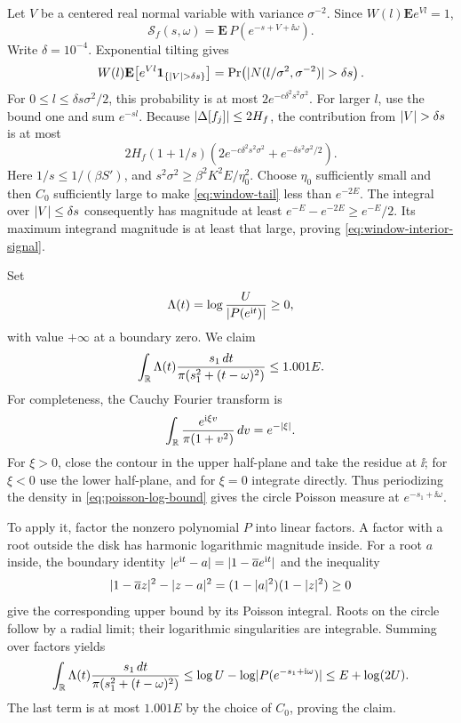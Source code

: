 Let $V$ be a centered real normal variable with variance $\sigma^{-2}$.
Since $W(l)\mathbf E e^{Vl}=1$,
\[
 \mathcal S_f(s,\omega)=\mathbf E\,P(e^{-s+V+\ii\omega}).
\]
Write $\delta=10^{-4}$.  Exponential tilting gives
\[
 W(l)\mathbf E\big[e^{Vl}\mathbf1_{\{\lvert V\rvert>\delta s\}}\big]
 =\Pr\!\left(\lvert N(l/\sigma^2,\sigma^{-2})\rvert>\delta s\right).
\]
For $0\le l\le\delta s\sigma^2/2$, this probability is at most
$2e^{-c\delta^2s^2\sigma^2}$.  For larger $l$, use the bound one and sum
$e^{-sl}$.  Because $\lvert \Delta[f_j]\rvert\le2H_f$, the contribution from
$\lvert V\rvert>\delta s$ is at most
\begin{equation}\label{eq:window-tail}
 2H_f(1+1/s)\left(2e^{-c\delta^2s^2\sigma^2}
                      +e^{-\delta s^2\sigma^2/2}\right).
\end{equation}
Here $1/s\le1/(\beta S')$, and
$s^2\sigma^2\ge\beta^2K^2E/\eta_0^2$.  Choose $\eta_0$ sufficiently small
and then $C_0$ sufficiently large to make \eqref{eq:window-tail} less than
$e^{-2E}$.  The integral over $\lvert V\rvert\le\delta s$ consequently has magnitude
at least $e^{-E}-e^{-2E}\ge e^{-E}/2$.  Its maximum integrand magnitude is
at least that large, proving \eqref{eq:window-interior-signal}.

Set
\[
 \Lambda(t)=\log\frac{U}{\lvert P(e^{\mathrm i t})\rvert}\ge0,
\]
with value $+\infty$ at a boundary zero.  We claim
\begin{equation}\label{eq:poisson-log-bound}
 \int_{\mathbb R}\Lambda(t)\frac{s_1\,dt}
 {\pi(s_1^2+(t-\omega)^2)}\le1.001E.
\end{equation}
For completeness, the Cauchy Fourier transform is
\begin{equation}\label{eq:cauchy-transform}
 \int_{\mathbb R}\frac{e^{\mathrm i\xi v}}{\pi(1+v^2)}\,dv=e^{-\lvert \xi\rvert}.
\end{equation}
For $\xi>0$, close the contour in the upper half-plane and take the residue
at $\ii$; for $\xi<0$ use the lower half-plane, and for $\xi=0$ integrate
directly.  Thus periodizing the density in
\eqref{eq:poisson-log-bound} gives the circle Poisson measure at
$e^{-s_1+\ii\omega}$.

To apply it, factor the nonzero polynomial $P$ into linear factors.  A factor
with a root outside the disk has harmonic logarithmic magnitude inside.  For
a root $a$ inside, the boundary identity
$\lvert e^{\mathrm i t}-a\rvert=\lvert 1-\overline a e^{\mathrm i t}\rvert$ and the inequality
\[
 \lvert 1-\overline a z\rvert^2-\lvert z-a\rvert^2
 =(1-\lvert a\rvert^2)(1-\lvert z\rvert^2)\ge0
\]
give the corresponding upper bound by its Poisson integral.  Roots on the
circle follow by a radial limit; their logarithmic singularities are
integrable.  Summing over factors yields
\[
 \int_{\mathbb R}\Lambda(t)\frac{s_1\,dt}{\pi(s_1^2+(t-\omega)^2)}
 \le\log U-\log\lvert P(e^{-s_1+\mathrm i\omega})\rvert
 \le E+\log(2U).
\]
The last term is at most $1.001E$ by the choice of $C_0$, proving the claim.

